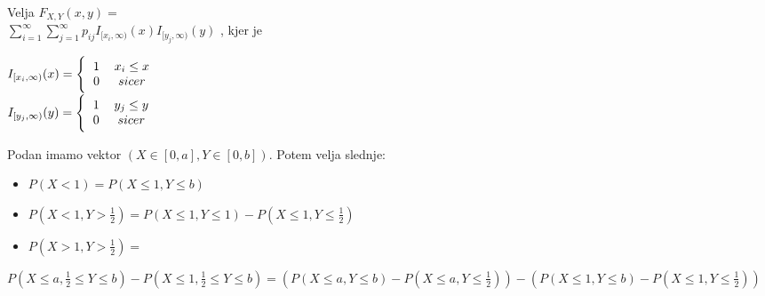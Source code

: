\documentclass{article}
\begin{document}
\begin{multicols}{2}
\begin{enumerate}
\begin{center}
		      \end{center}
		      Velja
		      \begin{math}
			      F_{X,Y}(x, y) =
		      \end{math}\\
		      \begin{math}
			      \sum_{i = 1}^{\infty} \sum_{j = 1}^{\infty} p_{ij}  I_{[x_i, \infty)} (x) I_{[y_j, \infty)} (y)
		      \end{math}
		      , kjer je
		      \begin{center}
			      \begin{math}
				      I_{[x_i, \infty)} (x) =
				      \Bigg\{\begin{tabular}{cc}
					      $1$ & $x_i \leq x$ \\
					      $0$ & $sicer$      \\
				      \end{tabular}
			      \end{math} \\
			      \begin{math}
				      I_{[y_j, \infty)} (y) =
				      \Bigg\{\begin{tabular}{cc}
					      $1$ & $y_j \leq y$ \\
					      $0$ & $sicer$      \\
				      \end{tabular}
			      \end{math}
		      \end{center}
	\end{enumerate}
	Podan imamo vektor $(X \in [0, a], Y \in [0,b])$. Potem velja slednje:
	\begin{itemize}
		\item $P(X < 1 ) = P(X \leq 1, Y \leq b)$
		\item $P(X < 1, Y > \frac{1}{2}) = P(X \leq 1, Y \leq 1) - P(X \leq 1, Y \leq \frac{1}{2})$
		\item \begin{math}
			      P(X > 1, Y > \frac{1}{2}) =
		      \end{math}
	\end{itemize}
	\begin{center}
		\begin{small}
			\begin{math}
				P(X \leq a, \frac{1}{2} \leq Y \leq b) - P(X \leq 1, \frac{1}{2} \leq Y \leq b) =
				(P(X \leq a, Y \leq b) - P(X \leq a, Y \leq \frac{1}{2})) - (P(X \leq 1, Y \leq b) - P(X \leq 1, Y \leq \frac{1}{2}))
			\end{math}
		\end{small}
	\end{center}


\end{multicols}
\end{document}
